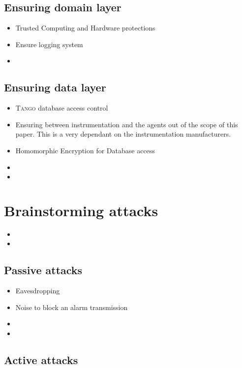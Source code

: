 \documentclass[10pt,a4paper,twoside]{llncs}
\newcommand{\tango}{\textsc{Tango} }
\begin{document}
%
\subsection{Ensuring domain layer}

\begin{itemize}
 \item Trusted Computing and Hardware protections
 \item Ensure logging system
 \item 
\end{itemize}

%
\subsection{Ensuring data layer}

\begin{itemize}
 \item \tango database access control
 \item Ensuring between instrumentation and the agents out of the scope of this paper. This is a very dependant on the instrumentation manufacturers.
 \item Homomorphic Encryption for Database access
 \item  
 \item 
\end{itemize}

%
\section{Brainstorming attacks}

\begin{itemize}
 \item
 \item 
\end{itemize}

%
\subsection{Passive attacks}

\begin{itemize}
 \item Eavesdropping
 \item Noise to block an alarm transmission
 \item 
 \item 
\end{itemize}

%
\subsection{Active attacks}
\end{document}
